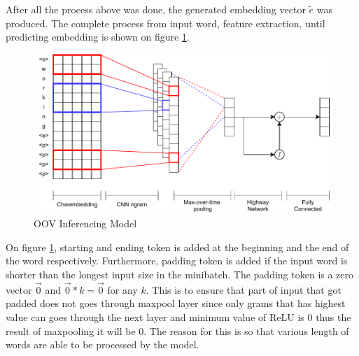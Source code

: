         After all the process above was done, the generated embedding
        vector $\tilde{e}$ was produced.
        The complete process from input word, feature extraction,
        until predicting embedding is shown on figure \ref{fig:model}.
        \begin{figure}
            \centering
            \includegraphics[width=.8\linewidth]{images/model2.pdf}
            \caption{OOV Inferencing Model}
            \label{fig:model}
        \end{figure}
        On figure \ref{fig:model}, starting and ending token is added
        at the beginning and the end of the word respectively.
        Furthermore, padding token is added if the input word is
        shorter than the longest input size in the minibatch. The
        padding token is a zero vector $\vec{0}$ and $\vec{0} * k =
        \vec{0}$ for any $k$. This is to ensure that part of input
        that got padded does not goes through maxpool layer since only
        grams that has highest value can goes through the next layer
        and minimum value of ReLU is 0 thus the result of maxpooling
        it will be 0. The reason for this is so that various length
        of words are able to be processed by the model.

